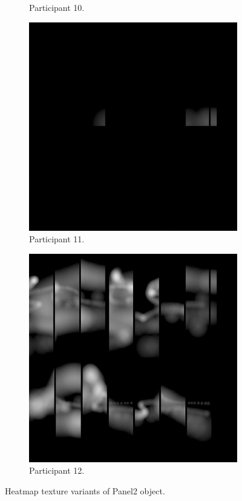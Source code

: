 \begin{figure}[!ht]
\begin{subfigure}[b]{0.24\textwidth}
        \caption{Participant 10.}
    \end{subfigure}
    \hfill    
    \begin{subfigure}[b]{0.24\textwidth}
        \centering
        \includegraphics[width=\textwidth]{img/data/Panel2/single/11.png}
        \caption{Participant 11.}
    \end{subfigure}
    \hfill    
    \begin{subfigure}[b]{0.24\textwidth}
        \centering
        \includegraphics[width=\textwidth]{img/data/Panel2/single/12.png}
        \caption{Participant 12.}
    \end{subfigure}
    \caption{Heatmap texture variants of Panel2 object.}
    \label{fig:Panel2-object-heatmaps.}
\end{figure}



